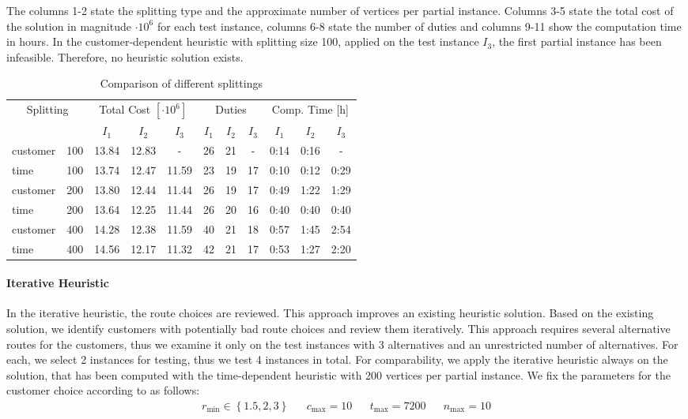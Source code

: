 The columns 1-2 state the splitting type and the approximate number of vertices per partial instance. Columns 3-5 state the total cost of the solution in magnitude $\cdot 10^6$ for each test instance, columns 6-8 state the number of duties and columns 9-11 show the computation time in hours. In the customer-dependent heuristic with splitting size 100, applied on the test instance $I_3$, the first partial instance has been infeasible. Therefore, no heuristic solution exists.

\begin{table}[htb]
	\centering
	\begin{tabular}{lc|ccc|ccc|ccc}
		\toprule
		\multicolumn{2}{c}{Splitting} & \multicolumn{3}{c}{Total Cost $[\cdot 10^6]$} & \multicolumn{3}{c}{Duties} & \multicolumn{3}{c}{Comp. Time [h]} \\
		\cmidrule(r){3-11}
		&& $I_1$ & $I_2$ & $I_3$ & $I_1$ & $I_2$ & $I_3$ & $I_1$ & $I_2$ & $I_3$ \\
		\midrule
		customer & 100  &  13.84 & 12.83 &   -    &  26 & 21 & -   &  0:14 & 0:16 &  -   \\
		time     & 100  &  13.74 & 12.47 & 11.59  &  23 & 19 & 17  &  0:10 & 0:12 & 0:29 \\
		customer & 200  &  13.80 & 12.44 & 11.44  &  26 & 19 & 17  &  0:49 & 1:22 & 1:29 \\
		time     & 200  &  13.64 & 12.25 & 11.44  &  26 & 20 & 16  &  0:40 & 0:40 & 0:40 \\
		customer & 400  &  14.28 & 12.38 & 11.59  &  40 & 21 & 18  &  0:57 & 1:45 & 2:54 \\
		time     & 400  &  14.56 & 12.17 & 11.32  &  42 & 21 & 17  &  0:53 & 1:27 & 2:20 \\
		\bottomrule
	\end{tabular}
	\caption{Comparison of different splittings}
	\label{tab:results:splittings}
\end{table}

\paragraph{Iterative Heuristic} \parfill

In the iterative heuristic, the route choices are reviewed. This approach improves an existing heuristic solution. Based on the existing solution, we identify customers with potentially bad route choices and review them iteratively. This approach requires several alternative routes for the customers, thus we examine it only on the test instances with 3 alternatives and an unrestricted number of alternatives. For each, we select 2 instances for testing, thus we test 4 instances in total. For comparability, we apply the iterative heuristic always on the solution, that has been computed with the time-dependent heuristic with 200 vertices per partial instance. We fix the parameters for the customer choice according to  as follows:
\begin{align*}
	r_{\min} \in\left\{1.5,2,3\right\} && c_{\max} = 10 && t_{\max} = 7200 && n_{\max} = 10
\end{align*}

